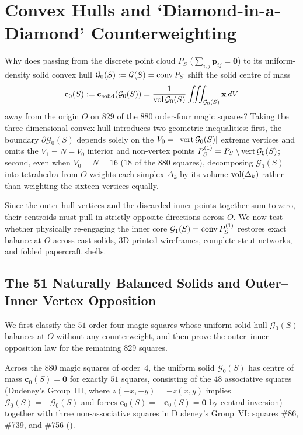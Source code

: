 \section{Convex Hulls and `Diamond-in-a-Diamond' Counterweighting}
\label{sec:nested}

Why does passing from the discrete point cloud $P_S$ ($\sum_{i,j}\mathbf p_{ij}=\mathbf 0$) to its uniform-density solid convex hull $\mathcal G_0(S):=\mathcal G(S)=\operatorname{conv} P_S$ shift the solid centre of mass
\[
\mathbf c_0(S) := \mathbf c_{\mathrm{solid}}(\mathcal G_0(S)) = \frac{1}{\operatorname{vol}\mathcal G_0(S)}\iiint_{\mathcal G_0(S)}\mathbf x\,dV
\]
away from the origin $O$ on $829$ of the $880$ order-four magic squares? Taking the three-dimensional convex hull introduces two geometric inequalities: first, the boundary $\partial\mathcal G_0(S)$ depends solely on the $V_0=|\operatorname{vert}\mathcal G_0(S)|$ extreme vertices and omits the $V_1=N-V_0$ interior and non-vertex points $P_S^{(1)}=P_S\setminus\operatorname{vert}\mathcal G_0(S)$; second, even when $V_0=N=16$ ($18$ of the $880$ squares), decomposing $\mathcal G_0(S)$ into tetrahedra from $O$ weights each simplex $\Delta_k$ by its volume $\operatorname{vol}(\Delta_k)$ rather than weighting the sixteen vertices equally.

Since the outer hull vertices and the discarded inner points together sum to zero, their centroids must pull in strictly opposite directions across $O$. We now test whether physically re-engaging the inner core $\mathcal G_1(S)=\operatorname{conv} P_S^{(1)}$ restores exact balance at $O$ across cast solids, 3D-printed wireframes, complete strut networks, and folded papercraft shells.

\subsection{The 51 Naturally Balanced Solids and Outer--Inner Vertex Opposition}

We first classify the $51$ order-four magic squares whose uniform solid hull $\mathcal G_0(S)$ balances at $O$ without any counterweight, and then prove the outer--inner opposition law for the remaining $829$ squares.

\begin{proposition}
\label{prop:51-balanced}
Across the $880$ magic squares of order~$4$, the uniform solid $\mathcal G_0(S)$ has centre of mass $\mathbf c_0(S)=\mathbf 0$ for exactly $51$ squares, consisting of the $48$ associative squares (Dudeney's Group~III, where $z(-x,-y)=-z(x,y)$ implies $\mathcal G_0(S)=-\mathcal G_0(S)$ and forces $\mathbf c_0(S)=-\mathbf c_0(S)=\mathbf 0$ by central inversion) together with three non-associative squares in Dudeney's Group~VI: squares \#86, \#739, and \#756 ().
\end{proposition}

